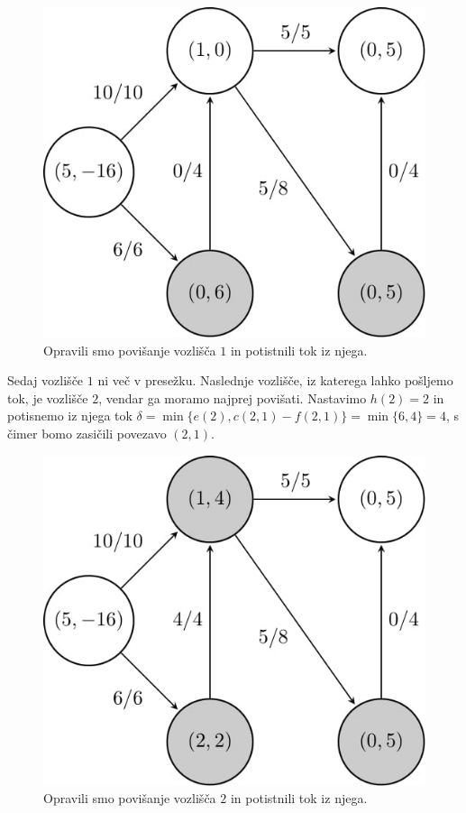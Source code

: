 \documentclass[mat1]{fmfdelo}
\begin{document}
\begin{figure}[H]
  \centering
  \includegraphics[scale=.358]{images/graf2-3/graf2-3-1.jpg}
  \caption{Opravili smo povišanje vozlišča $1$ in potistnili tok iz njega.}
\end{figure}

Sedaj vozlišče $1$ ni več v presežku. Naslednje vozlišče, iz katerega lahko pošljemo tok, je vozlišče $2$, vendar ga moramo najprej povišati.
Nastavimo $h(2) = 2$ in potisnemo iz njega tok $\delta = \min\{e(2), c(2,1) - f(2,1)\} = \min\{6, 4\} = 4$, s čimer bomo zasičili
povezavo $(2,1)$.

\begin{figure}[H]
  \centering
  \includegraphics[scale=.358]{images/graf2-4/graf2-4-1.jpg}
  \caption{Opravili smo povišanje vozlišča $2$ in potistnili tok iz njega.}
\end{figure}
\end{document}
